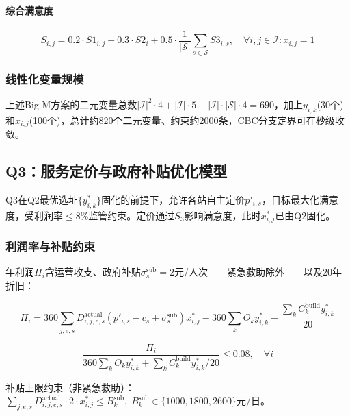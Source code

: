 \paragraph{综合满意度}

\begin{equation}
S_{i,j} = 0.2 \cdot S1_{i,j} + 0.3 \cdot S2_i + 0.5 \cdot \frac{1}{|\mathcal{S}|}\sum_{s\in\mathcal{S}} S3_{i,s}, \quad \forall i,j \in \mathcal{I}: x_{i,j}=1
\end{equation}

\subsubsection{线性化变量规模}

上述Big-M方案的二元变量总数$|\mathcal{I}|^2\cdot4 + |\mathcal{I}|\cdot5 + |\mathcal{I}|\cdot|\mathcal{S}|\cdot4 = 690$，加上$y_{i,k}$(30个)和$x_{i,j}$(100个)，总计约820个二元变量、约束约2000条，CBC分支定界可在秒级收敛\cite{wolsey1998}。

\subsection{Q3：服务定价与政府补贴优化模型}

Q3在Q2最优选址$\{y_{i,k}^*\}$固化的前提下，允许各站自主定价$p'_{i,s}$，目标最大化满意度，受利润率$\le 8\%$监管约束。定价通过$S_3$影响满意度，此时$x_{i,j}^*$已由Q2固化。

\subsubsection{利润率与补贴约束}

年利润$\Pi_i$含运营收支、政府补贴$\sigma_s^{\text{sub}}=2$元/人次——紧急救助除外——以及20年折旧：

\begin{equation}
\Pi_i = 360 \sum_{j,e,s} D_{i,j,e,s}^{\text{actual}} (p'_{i,s} - c_s + \sigma_s^{\text{sub}}) x_{i,j}^* - 360 \sum_k O_k y_{i,k}^* - \frac{\sum_k C_k^{\text{build}} y_{i,k}^*}{20}
\end{equation}

\begin{equation}
\frac{\Pi_i}{360 \sum_k O_k y_{i,k}^* + \sum_k C_k^{\text{build}} y_{i,k}^* / 20} \le 0.08, \quad \forall i
\end{equation}

补贴上限约束（非紧急救助）：$\sum_{j,e,s} D_{i,j,e,s}^{\text{actual}} \cdot 2 \cdot x_{i,j}^* \le B_k^{\text{sub}}, \; B_k^{\text{sub}} \in \{1000, 1800, 2600\}$元/日。

